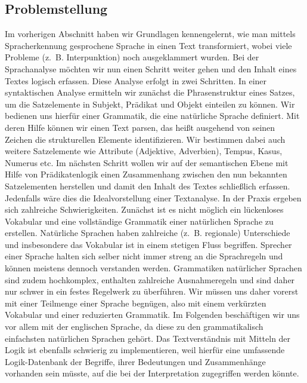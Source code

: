 \subsection{Problemstellung}
Im vorherigen Abschnitt haben wir Grundlagen kennengelernt, wie man mittels Spracherkennung gesprochene Sprache in einen Text transformiert, wobei viele Probleme (z.~B.
Interpunktion) noch ausgeklammert wurden.
Bei der Sprachanalyse möchten wir nun einen Schritt weiter gehen und den Inhalt eines Textes logisch erfassen.
Diese Analyse erfolgt in zwei Schritten.
In einer syntaktischen Analyse ermitteln wir zunächst die Phrasenstruktur eines Satzes, um die Satzelemente in Subjekt, Prädikat und Objekt einteilen zu können.
Wir bedienen uns hierfür einer Grammatik, die eine natürliche Sprache definiert.
Mit deren Hilfe können wir einen Text parsen, das heißt ausgehend von seinen Zeichen die strukturellen Elemente identifizieren.
Wir bestimmen dabei auch weitere Satzelemente wie Attribute (Adjektive, Adverbien), Tempus, Kasus, Numerus etc.
Im nächsten Schritt wollen wir auf der semantischen Ebene mit Hilfe von Prädikatenlogik einen Zusammenhang zwischen den nun bekannten Satzelementen herstellen und damit den Inhalt des Textes schließlich erfassen.
Jedenfalls wäre dies die Idealvorstellung einer Textanalyse.
In der Praxis ergeben sich zahlreiche Schwierigkeiten.
Zunächst ist es nicht möglich ein lückenloses Vokabular und eine vollständige Grammatik einer natürlichen Sprache zu erstellen.
Natürliche Sprachen haben zahlreiche (z.~B.
regionale) Unterschiede und insbesondere das Vokabular ist in einem stetigen Fluss begriffen.
Sprecher einer Sprache halten sich selber nicht immer streng an die Sprachregeln und können meistens dennoch verstanden werden.
Grammatiken natürlicher Sprachen sind zudem hochkomplex, enthalten zahlreiche Ausnahmeregeln und sind daher nur schwer in ein festes Regelwerk zu überführen.
Wir müssen uns daher vorerst mit einer Teilmenge einer Sprache begnügen, also mit einem verkürzten Vokabular und einer reduzierten Grammatik.
Im Folgenden beschäftigen wir uns vor allem mit der englischen Sprache, da diese zu den grammatikalisch einfachsten natürlichen Sprachen gehört.
Das Textverständnis mit Mitteln der Logik ist ebenfalls schwierig zu implementieren, weil hierfür eine umfassende Logik-Datenbank der Begriffe, ihrer Bedeutungen und Zusammenhänge vorhanden sein müsste, auf die bei der Interpretation zugegriffen werden könnte.

